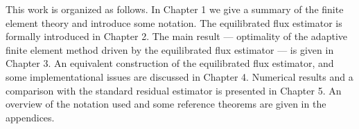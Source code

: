 \documentclass[thesis.tex]{subfiles}
\begin{document}
This work is organized as follows.
In Chapter 1 
we give a summary of the finite element theory and introduce some notation. The equilibrated flux estimator is formally introduced 
in Chapter 2. The main result --- optimality of the adaptive finite element method driven by the equilibrated flux estimator --- is 
given in Chapter 3.
 An equivalent construction of the equilibrated flux estimator, and some implementational issues are discussed in Chapter 4. Numerical results and a comparison with the standard residual estimator is presented
in Chapter 5. An overview of the notation used and some reference theorems are given in the appendices. 
\end{document}
